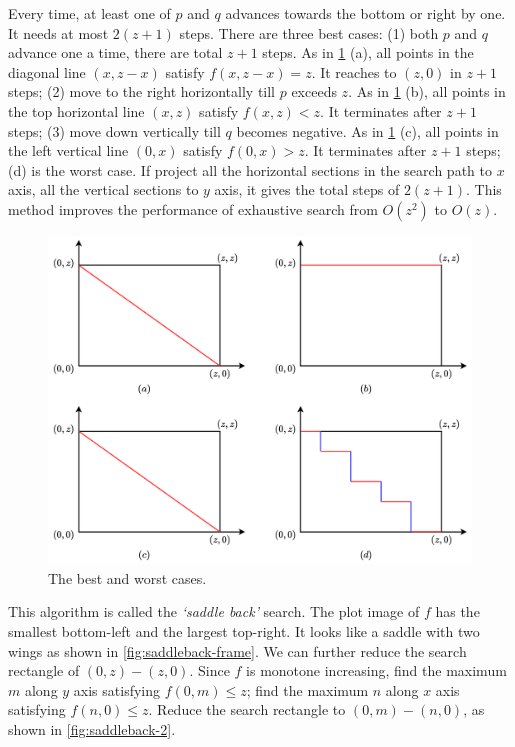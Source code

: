 \documentclass[b5paper]{article}
\begin{document}
Every time, at least one of $p$ and $q$ advances towards the bottom or right by one. It needs at most $2(z+1)$ steps. There are three best cases: (1) both $p$ and $q$ advance one a time, there are total $z + 1$ steps. As in \cref{fig:saddleback-1-cases} (a), all points in the diagonal line $(x, z-x)$ satisfy $f(x, z-x) = z$. It reaches to $(z, 0)$ in $z + 1$ steps; (2) move to the right horizontally till $p$ exceeds $z$. As in \cref{fig:saddleback-1-cases} (b), all points in the top horizontal line $(x, z)$ satisfy $f(x, z) < z$. It terminates after $z + 1$ steps; (3) move down vertically till $q$ becomes negative. As in \cref{fig:saddleback-1-cases} (c), all points in the left vertical line $(0, x)$ satisfy $f(0, x) > z$. It terminates after $z + 1$ steps; (d) is the worst case. If project all the horizontal sections in the search path to $x$ axis, all the vertical sections to $y$ axis, it gives the total steps of $2(z+1)$. This method improves the performance of exhaustive search from $O(z^2)$ to $O(z)$.

\begin{figure}[htbp]
 \centering
 \includegraphics[scale=0.5]{img/saddle-back-paths}
 \caption{The best and worst cases.}
 \label{fig:saddleback-1-cases}
\end{figure}

This algorithm is called the {\em `saddle back'} search. The plot image of $f$ has the smallest bottom-left and the largest top-right. It looks like a saddle with two wings as shown in \cref{fig:saddleback-frame}. We can further reduce the search rectangle of $(0, z)- (z, 0)$. Since $f$ is monotone increasing, find the maximum $m$ along $y$ axis satisfying $f(0, m) \leq z$; find the maximum $n$ along $x$ axis satisfying $f(n, 0) \leq z$. Reduce the search rectangle to $(0, m) - (n, 0)$, as shown in \cref{fig:saddleback-2}.
\end{document}

